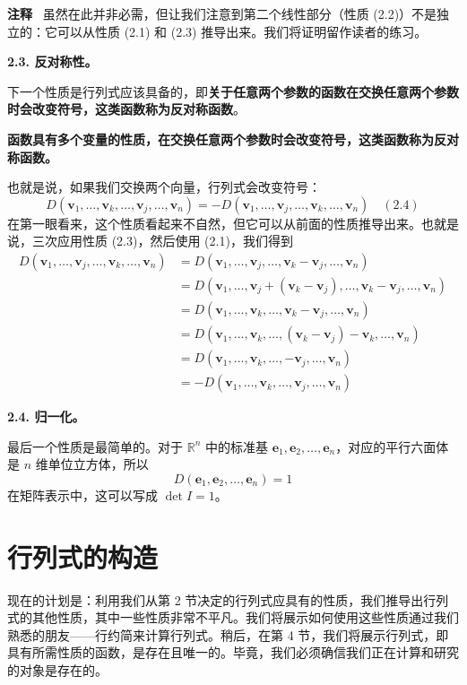\textbf{注释}~ 虽然在此并非必需，但让我们注意到第二个线性部分（性质 (2.2)）不是独立的：它可以从性质 (2.1) 和 (2.3) 推导出来。我们将证明留作读者的练习。

\textbf{2.3. 反对称性。}

下一个性质是行列式应该具备的，即\textbf{关于任意两个参数的函数在交换任意两个参数时会改变符号，这类函数称为反对称函数}。

\textbf{函数具有多个变量的性质，在交换任意两个参数时会改变符号，这类函数称为反对称函数。}

也就是说，如果我们交换两个向量，行列式会改变符号：
$$
D(\mathbf{v}_1, \dots, \mathbf{v}_k, \dots, \mathbf{v}_j, \dots, \mathbf{v}_n) = - D(\mathbf{v}_1, \dots, \mathbf{v}_j, \dots, \mathbf{v}_k, \dots, \mathbf{v}_n) \quad (2.4)
$$
在第一眼看来，这个性质看起来不自然，但它可以从前面的性质推导出来。也就是说，三次应用性质 (2.3)，然后使用 (2.1)，我们得到
\begin{align*} D(\mathbf{v}_1, \dots, \mathbf{v}_j, \dots, \mathbf{v}_k, \dots, \mathbf{v}_n) &= D(\mathbf{v}_1, \dots, \mathbf{v}_j, \dots, \mathbf{v}_k - \mathbf{v}_j, \dots, \mathbf{v}_n) \\ &= D(\mathbf{v}_1, \dots, \mathbf{v}_j + (\mathbf{v}_k - \mathbf{v}_j), \dots, \mathbf{v}_k - \mathbf{v}_j, \dots, \mathbf{v}_n) \\ &= D(\mathbf{v}_1, \dots, \mathbf{v}_k, \dots, \mathbf{v}_k - \mathbf{v}_j, \dots, \mathbf{v}_n) \\ &= D(\mathbf{v}_1, \dots, \mathbf{v}_k, \dots, (\mathbf{v}_k - \mathbf{v}_j) - \mathbf{v}_k, \dots, \mathbf{v}_n) \\ &= D(\mathbf{v}_1, \dots, \mathbf{v}_k, \dots, -\mathbf{v}_j, \dots, \mathbf{v}_n) \\ &= - D(\mathbf{v}_1, \dots, \mathbf{v}_k, \dots, \mathbf{v}_j, \dots, \mathbf{v}_n) \end{align*}

\textbf{2.4. 归一化。}

最后一个性质是最简单的。对于 $\mathbb{R}^n$ 中的标准基 $\mathbf{e}_1, \mathbf{e}_2, \dots, \mathbf{e}_n$，对应的平行六面体是 $n$ 维单位立方体，所以
$$
D(\mathbf{e}_1, \mathbf{e}_2, \dots, \mathbf{e}_n) = 1
$$
在矩阵表示中，这可以写成 $\det I = 1$。


\section{行列式的构造}

现在的计划是：利用我们从第 2 节决定的行列式应具有的性质，我们推导出行列式的其他性质，其中一些性质非常不平凡。我们将展示如何使用这些性质通过我们熟悉的朋友——行约简来计算行列式。稍后，在第 4 节，我们将展示行列式，即具有所需性质的函数，是存在且唯一的。毕竟，我们必须确信我们正在计算和研究的对象是存在的。

